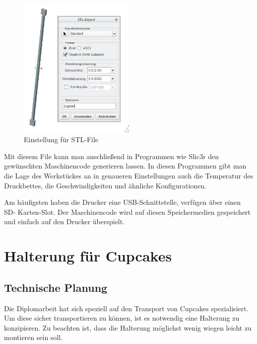 			\begin{figure}[tbh]
			\begin{centering}
			\includegraphics[width = 0.5\textwidth]{Bilder/stl_file_optionen}
			\par\end{centering}
	 		\caption{Einstellung für STL-File}
			\label{stl_file_optionen}
			\end{figure}

		Mit diesem File kann man anschließend in Programmen wie Slic3r den gewünschten Maschinencode generieren lassen.
		In diesen Programmen gibt man die Lage des Werkstückes an \bzw in genaueren Einstellungen auch die Temperatur des Druckbettes, die Geschwindigkeiten und ähnliche Konfigurationen.

		Am häufigsten haben die Drucker eine USB-Schnittstelle, \bzw verfügen über einen SD- Karten-Slot.
		Der Maschinencode wird auf diesen Speichermedien gespeichert und einfach auf den Drucker überspielt.

				\newpage


\section{Halterung für Cupcakes}

		\subsection{Technische Planung}

		Die Diplomarbeit hat sich speziell auf den Transport von Cupcakes spezialisiert. Um diese sicher transportieren zu können, ist es notwendig eine Halterung zu konzipieren.
		Zu beachten ist, dass die Halterung möglichst wenig wiegen \bzw leicht zu montieren sein soll.

